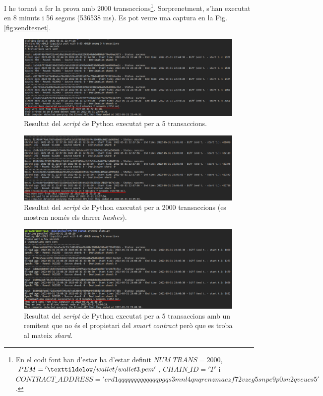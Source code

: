 \documentclass[11pt,a4paper]{article}
\begin{document}
I he tornat a fer la prova amb 2000 transaccions\footnote{En el codi font han d'estar ha d'estar definit \({NUM\_TRANS=2000}\), \({PEM={'\texttildelow/wallet/wallet3.pem'}}\), \({CHAIN\_ID={'T'}}\) i \(CONTRACT\_ADDRESS={'erd1qqqqqqqqqqqqqpgqs3mnl4qnqrenzmaezf72vzeg5snpe9p0sn2qveucs5'}\).}. Sorprenetment, s'han executat en 8 minuts i 56 segons (536538 ms). Es pot veure una captura en la Fig. \ref{fig:sendtesnet}.
\begin{figure}[h]
\includegraphics[width=0.99\textwidth]{send5trans.png}
\centering
\caption{Resultat del \textit{script} de Python executat per a 5 transaccions.}\label{fig:send5trans}
\end{figure} 

\begin{figure}[h]
\includegraphics[width=0.99\textwidth]{send2000trans1.png}
\centering
\caption{Resultat del \textit{script} de Python executat per a 2000 transaccions (es mostren només els darrer \textit{hashes}).}\label{fig:send2000trans1}
\end{figure} 

\begin{figure}[h]
\includegraphics[width=0.99\textwidth]{send5transnotowner.png}
\centering
\caption{Resultat del \textit{script} de Python executat per a 5 transaccions amb un remitent que no és el propietari del \textit{smart contract} però que es troba al mateix \textit{shard}.}\label{fig:send5transnotowner}
\end{figure} 
\end{document}
